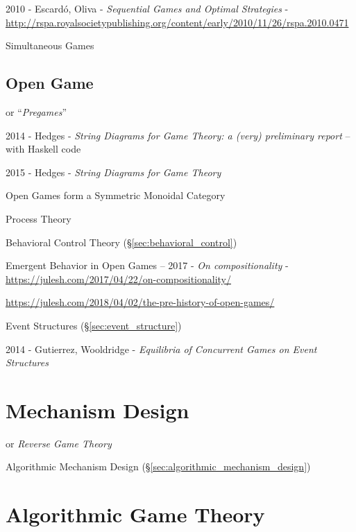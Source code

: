 2010 - Escard\'o, Oliva - \emph{Sequential Games and Optimal Strategies} -
\url{http://rspa.royalsocietypublishing.org/content/early/2010/11/26/rspa.2010.0471}

Simultaneous Games



\subsection{Open Game}\label{sec:open_game}

or ``\emph{Pregames}''

2014 - Hedges - \emph{String Diagrams for Game Theory: a (very) preliminary
  report} -- with Haskell code

2015 - Hedges - \emph{String Diagrams for Game Theory}

Open Games form a Symmetric Monoidal Category

Process Theory

Behavioral Control Theory (\S\ref{sec:behavioral_control})

Emergent Behavior in Open Games --
2017 - \emph{On compositionality} -
\url{https://julesh.com/2017/04/22/on-compositionality/}

\url{https://julesh.com/2018/04/02/the-pre-history-of-open-games/}

Event Structures (\S\ref{sec:event_structure})

2014 - Gutierrez, Wooldridge - \emph{Equilibria of Concurrent Games on Event
  Structures}



\section{Mechanism Design}\label{sec:mechanism_design}

or \emph{Reverse Game Theory}

Algorithmic Mechanism Design (\S\ref{sec:algorithmic_mechanism_design})



\section{Algorithmic Game Theory}\label{sec:algorithmic_game_theory}

